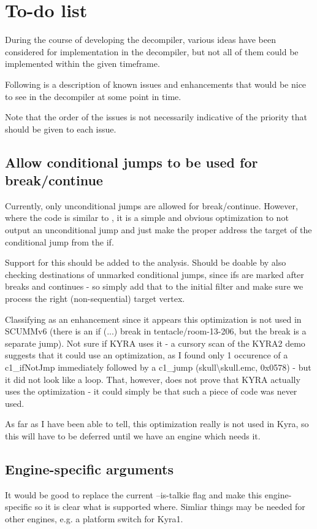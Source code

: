\section{To-do list}
During the course of developing the decompiler, various ideas have been considered for implementation in the decompiler, but not all of them could be implemented within the given timeframe.

Following is a description of known issues and enhancements that would be nice to see in the decompiler at some point in time.

Note that the order of the issues is not necessarily indicative of the priority that should be given to each issue.

\subsection{Allow conditional jumps to be used for break/continue}
Currently, only unconditional jumps are allowed for break/continue. However, where the code is similar to , it is a simple and obvious optimization to not output an unconditional jump and just make the proper address the target of the conditional jump from the if.

Support for this should be added to the analysis. Should be doable by also checking destinations of unmarked conditional jumps, since ifs are marked after breaks and continues - so simply add that to the initial filter and make sure we process the right (non-sequential) target vertex.

Classifying as an enhancement since it appears this optimization is not used in SCUMMv6 (there is an if (...) break in tentacle/room-13-206, but the break is a separate jump). Not sure if KYRA uses it - a cursory scan of the KYRA2 demo suggests that it could use an optimization, as I found only 1 occurence of a c1\_ifNotJmp immediately followed by a c1\_jump (skull\textbackslash skull.emc, 0x0578) - but it did not look like a loop. That, however, does not prove that KYRA actually uses the optimization - it could simply be that such a piece of code was never used.

As far as I have been able to tell, this optimization really is not used in Kyra, so this will have to be deferred until we have an engine which needs it.

\subsection{Engine-specific arguments}
It would be good to replace the current --is-talkie flag and make this engine-specific so it is clear what is supported where. Simliar things may be needed for other engines, e.g. a platform switch for Kyra1.


